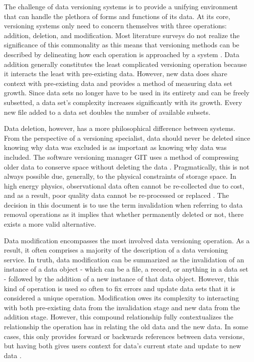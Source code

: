 The challenge of data versioning systems is to provide a unifying environment that can handle the plethora of forms and functions of its data.
At its core, versioning systems only need to concern themselves with three operations: addition, deletion, and modification.
Most literature surveys do not realize the significance of this commonality as this means that versioning methods can be described by delineating how each operation is approached by a system \cite{Tagger2005} \cite{rohtua}.
Data addition generally constitutes the least complicated versioning operation because it interacts the least with pre-existing data.
However, new data does share context with pre-existing data and provides a method of measuring data set growth.
Since data sets no longer have to be used in its entirety and can be freely subsetted, a data set's complexity increases significantly with its growth.
Every new file added to a data set doubles the number of available subsets.

Data deletion, however, has a more philosophical difference between systems.
From the perspective of a versioning specialist, data should never be deleted since knowing why data was excluded is as important as knowing why data was included.
The software versioning manager GIT uses a method of compressing older data to conserve space without deleting the data \cite{Chacon:2009:PG:1618548}.
Pragmatically, this is not always possible due, generally, to the physical constraints of storage space.
In high energy physics, observational data often cannot be re-collected due to cost, and as a result, poor quality data cannot be re-processed or replaced \cite{Cavanaugh2002}.
The decision in this document is to use the term invalidation when referring to data removal operations as it implies that whether permanently deleted or not, there exists a more valid alternative.

Data modification encompasses the most involved data versioning operation.
As a result, it often comprises a majority of the description of a data versioning service.
In truth, data modification can be summarized as the invalidation of an instance of a data object - which can be a file, a record, or anything in a data set - followed by the addition of a new instance of that data object.
However, this kind of operation is used so often to fix errors and update data sets that it is considered a unique operation.
Modification owes its complexity to interacting with both pre-existing data from the invalidation stage and new data from the addition stage.
However, this compound relationship fully contextualizes the relationship the operation has in relating the old data and the new data.
In some cases, this only provides forward or backwards references between data versions, but having both gives users context for data's current state and update to new data \cite{Klein01ontologyversioning}.


